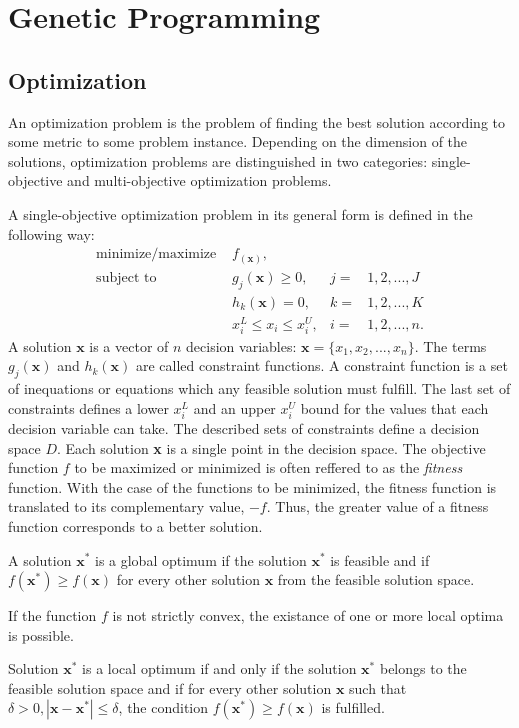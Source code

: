 \chapter{Genetic Programming}
\section{Optimization}
An optimization problem is the problem of finding the best solution according to some metric to some problem instance.%
Depending on the dimension of the solutions, optimization problems are distinguished in two categories: single-objective and multi-objective optimization problems.

A single-objective optimization problem in its general form is defined in the following way:
\begin{align*}
\label{opt_problem}
\text{minimize/maximize } & f_(\textbf{x}),   \\
\text{subject to } & g_j(\textbf{x}) \geq 0, & j = & 1, 2, ..., J \\
           & h_k(\textbf{x}) = 0, & k = & 1, 2, ..., K \\
           & x_{i}^{L} \leq x_i \leq x_{i}^{U}, & i = & 1, 2, ..., n. 
\end{align*}
A solution $\textbf{x}$ is a vector of $n$ decision variables: $\textbf{x} = \{x_1,x_2,...,x_n\}$.
The terms $g_j(\textbf{x})$ and $h_k(\textbf{x})$ are called constraint functions. 
A constraint function is a set of inequations or equations which any feasible solution must fulfill. 
The last set of constraints defines a lower $x_{i}^{L}$ and an upper $x_{i}^{U}$ bound for the values that each decision variable can take. 
The described sets of constraints define a decision space $D$.
Each solution \textbf{x} is a single point in the decision space.
The objective function $f$ to be maximized or minimized is often reffered to as the \textit{fitness} function.
With the case of the functions to be minimized, the fitness function is translated to its complementary value, $-f$.
Thus, the greater value of a fitness function corresponds to a better solution.

\begin{mydef}
A solution $\textbf{x}^{*}$ is a global optimum if the solution $\textbf{x}^{*}$ is feasible and if $f(\textbf{x}^{*}) \geq f(\textbf{x})$ for every other solution $\textbf{x}$ from the feasible solution space.
\end{mydef}
If the function $f$ is not strictly convex, the existance of one or more local optima is possible.
\begin{mydef}
Solution $\textbf{x}^{*}$ is a local optimum if and only if the solution $\textbf{x}^{*}$ belongs to the feasible solution space and if for every other solution $\textbf{x}$ such that 
$\delta > 0, |\textbf{x} - \textbf{x}^{*}| \leq \delta$, the condition $f(\textbf{x}^{*}) \geq f(\textbf{x})$ is fulfilled.
\end{mydef}

